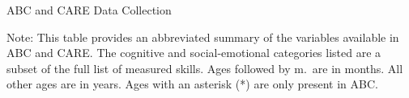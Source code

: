 \begin{table}[H]
\centering
\caption{ABC and CARE Data Collection}
\label{tab:abc-care-data}
\begin{threeparttable}
\footnotesize
	
\begin{tablenotes}
\item Note: This table provides an abbreviated summary of the variables available in ABC and CARE. The cognitive and social-emotional categories listed are a subset of the full list of measured skills. Ages followed by m.\ are in months. All other ages are in years. Ages with an asterisk (*) are only present in ABC. 
\end{tablenotes}
\end{threeparttable}
\end{table}

